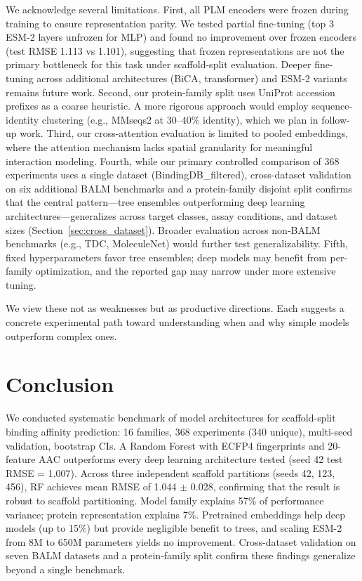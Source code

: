 \documentclass[pmlr,twocolumn]{jmlr}
\begin{document}
We acknowledge several limitations. First, all PLM encoders were frozen during training to ensure representation parity. We tested partial fine-tuning (top 3 ESM-2 layers unfrozen for MLP) and found no improvement over frozen encoders (test RMSE 1.113 vs 1.101), suggesting that frozen representations are not the primary bottleneck for this task under scaffold-split evaluation. Deeper fine-tuning across additional architectures (BiCA, transformer) and ESM-2 variants remains future work. Second, our protein-family split uses UniProt accession prefixes as a coarse heuristic. A more rigorous approach would employ sequence-identity clustering (e.g., MMseqs2 at 30--40\% identity), which we plan in follow-up work. Third, our cross-attention evaluation is limited to pooled embeddings, where the attention mechanism lacks spatial granularity for meaningful interaction modeling. Fourth, while our primary controlled comparison of 368 experiments uses a single dataset (BindingDB\_filtered), cross-dataset validation on six additional BALM benchmarks and a protein-family disjoint split confirms that the central pattern---tree ensembles outperforming deep learning architectures---generalizes across target classes, assay conditions, and dataset sizes (Section~\ref{sec:cross_dataset}). Broader evaluation across non-BALM benchmarks (e.g., TDC, MoleculeNet) would further test generalizability. Fifth, fixed hyperparameters favor tree ensembles; deep models may benefit from per-family optimization, and the reported gap may narrow under more extensive tuning.

We view these not as weaknesses but as productive directions. Each suggests a concrete experimental path toward understanding when and why simple models outperform complex ones.

\section{Conclusion}

We conducted  systematic benchmark of model architectures for scaffold-split binding affinity prediction: 16 families, 368 experiments (340 unique), multi-seed validation, bootstrap CIs. A Random Forest with ECFP4 fingerprints and 20-feature AAC outperforms every deep learning architecture tested (seed 42 test RMSE = 1.007). Across three independent scaffold partitions (seeds 42, 123, 456), RF achieves mean RMSE of 1.044 $\pm$ 0.028, confirming that the result is robust to scaffold partitioning. Model family explains 57\% of performance variance; protein representation explains 7\%. Pretrained embeddings help deep models (up to 15\%) but provide negligible benefit to trees, and scaling ESM-2 from 8M to 650M parameters yields no improvement. Cross-dataset validation on seven BALM datasets and a protein-family split confirm these findings generalize beyond a single benchmark.
\end{document}
